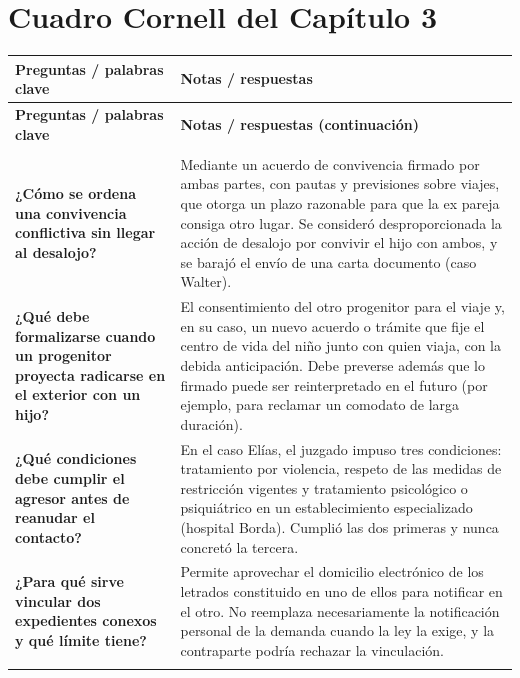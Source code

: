 \documentclass[12pt,oneside]{book}
\begin{document}
\section{Cuadro Cornell del Capítulo 3}

\begin{longtable}{>{\raggedright\arraybackslash}p{} >{\raggedright\arraybackslash}p{}}
\toprule
\textbf{Preguntas / palabras clave} & \textbf{Notas / respuestas} \\
\midrule
\endfirsthead
\toprule
\textbf{Preguntas / palabras clave} & \textbf{Notas / respuestas (continuación)} \\
\midrule
\endhead
\midrule
\multicolumn{2}{r}{\small\itshape continúa en la página siguiente} \\
\endfoot
\bottomrule
\endlastfoot

\textbf{¿Cómo se ordena una convivencia conflictiva sin llegar al desalojo?} &
Mediante un acuerdo de convivencia firmado por ambas partes, con pautas y previsiones sobre viajes, que otorga un plazo razonable para que la ex pareja consiga otro lugar. Se consideró desproporcionada la acción de desalojo por convivir el hijo con ambos, y se barajó el envío de una carta documento (caso Walter). \\
\addlinespace

\textbf{¿Qué debe formalizarse cuando un progenitor proyecta radicarse en el exterior con un hijo?} &
El consentimiento del otro progenitor para el viaje y, en su caso, un nuevo acuerdo o trámite que fije el centro de vida del niño junto con quien viaja, con la debida anticipación. Debe preverse además que lo firmado puede ser reinterpretado en el futuro (por ejemplo, para reclamar un comodato de larga duración). \\
\addlinespace

\textbf{¿Qué condiciones debe cumplir el agresor antes de reanudar el contacto?} &
En el caso Elías, el juzgado impuso tres condiciones: tratamiento por violencia, respeto de las medidas de restricción vigentes y tratamiento psicológico o psiquiátrico en un establecimiento especializado (hospital Borda). Cumplió las dos primeras y nunca concretó la tercera. \\
\addlinespace

\textbf{¿Para qué sirve vincular dos expedientes conexos y qué límite tiene?} &
Permite aprovechar el domicilio electrónico de los letrados constituido en uno de ellos para notificar en el otro. No reemplaza necesariamente la notificación personal de la demanda cuando la ley la exige, y la contraparte podría rechazar la vinculación. \\
\addlinespace


\end{longtable}
\end{document}
